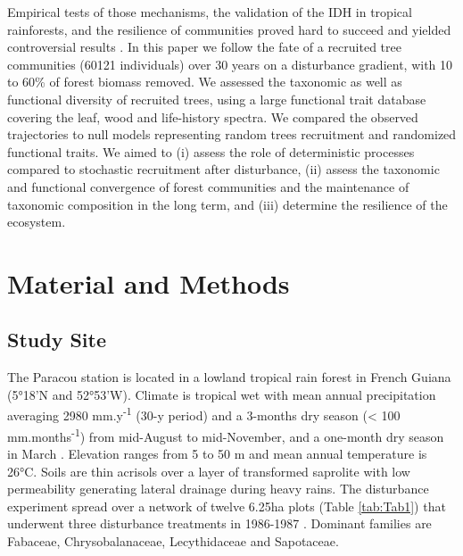 \documentclass[fleqn,10pt]{ArtEcoFoG} %
\begin{document}
Empirical tests of those mechanisms, the validation of the IDH in
tropical rainforests, and the resilience of communities proved hard to
succeed and yielded controversial results
\citep{Hubbell1999, Molino2001, Sheil2003}. In this paper we follow the
fate of a recruited tree communities (60121 individuals) over 30 years
on a disturbance gradient, with 10 to 60\% of forest biomass removed. We
assessed the taxonomic as well as functional diversity of recruited
trees, using a large functional trait database covering the leaf, wood
and life-history spectra. We compared the observed trajectories to null
models representing random trees recruitment and randomized functional
traits. We aimed to (i) assess the role of deterministic processes
compared to stochastic recruitment after disturbance, (ii) assess the
taxonomic and functional convergence of forest communities and the
maintenance of taxonomic composition in the long term, and (iii)
determine the resilience of the ecosystem.

\section{Material and Methods}\label{material-and-methods}

\subsection{Study Site}\label{study-site}

The Paracou station is located in a lowland tropical rain forest in
French Guiana (5°18'N and 52°53'W). Climate is tropical wet with mean
annual precipitation averaging 2980 mm.y\textsuperscript{-1} (30-y
period) and a 3-months dry season (\textless{} 100
mm.months\textsuperscript{-1}) from mid-August to mid-November, and a
one-month dry season in March \citep{Wagner2011}. Elevation ranges from
5 to 50 m and mean annual temperature is 26°C. Soils are thin acrisols
over a layer of transformed saprolite with low permeability generating
lateral drainage during heavy rains. The disturbance experiment spread
over a network of twelve 6.25ha plots (Table \ref{tab:Tab1}) that
underwent three disturbance treatments in 1986-1987 \citep{Herault2018}.
Dominant families are Fabaceae, Chrysobalanaceae, Lecythidaceae and
Sapotaceae.
\end{document}
